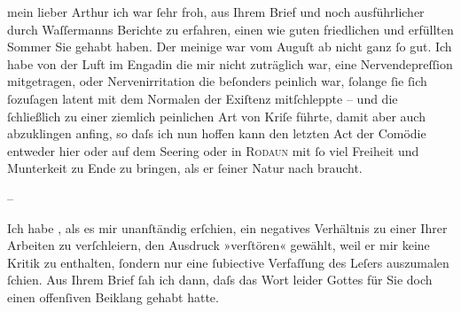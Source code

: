 \pstart{}mein lieber Arthur\pend\vspace{0.5em}
\pstart
           ich war{ }ſehr froh, aus Ihrem Brief und noch ausführlicher durch Waſſermanns Berichte zu erfahren, einen wie guten friedlichen
               und erfüllten Sommer Sie gehabt haben. Der meinige war vom Auguſt ab nicht ganz{ }ſo
               gut. Ich habe von der Luft im Engadin die mir
               nicht zuträglich war, eine Nervendepreſſion {\pb}mitgetragen, oder Nervenirritation
               die beſonders peinlich war,{ }ſolange{ }ſie{ }ſich{ }ſozuſagen latent mit dem Normalen der
               Exiſtenz mitſchleppte – und die{ }ſchließlich zu einer ziemlich peinlichen Art von
               Kriſe führte, damit aber auch abzuklingen anfing, so daſs ich nun hoffen kann den
               letzten Act der Comödie
               entweder hier oder auf dem Se{\geminationm}ering oder in \textsc{Rodaun} mit{ }ſo viel Freiheit und Munterkeit zu Ende zu {\pb}bringen, als er{ }ſeiner Natur nach
               braucht.\pend
           
\pstart
           \numberlinefalse{}–\numberlinetrue{}\pend
           
\pstart
           Ich habe \label{K_L01789-1v}\label{K_L01789-1}, als es mir unanſtändig erſchien, ein negatives Verhältnis zu einer Ihrer Arbeiten zu verſchleiern, den
               Ausdruck »verſtören« gewählt, weil er mir keine Kritik zu enthalten,{ }ſondern nur eine{ }ſubiective Verfaſſung des Leſers auszumalen{ }ſchien. Aus Ihrem Brief{ }ſah ich dann,
               daſs das Wort leider Gottes für Sie doch einen offenſiven {\pb}Beiklang gehabt hatte.\pend
           
